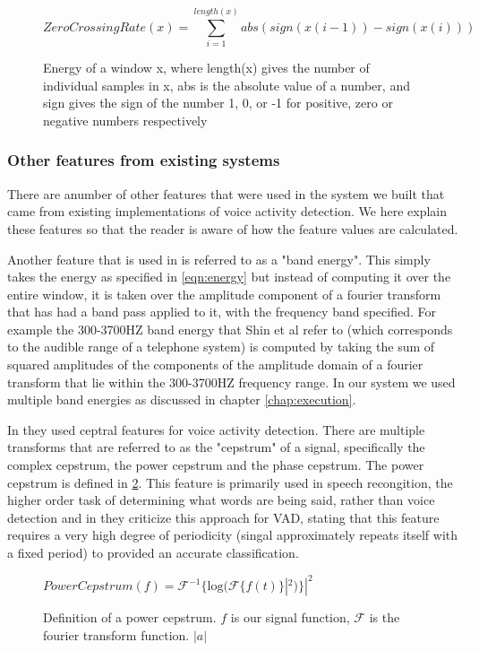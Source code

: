 \documentclass[ %
                    author={Sam Phippen},
                supervisor={Dr. Rafal Bogacz},
                     title={Real time voice activity detectors in noisy personal computing environments},
                  subtitle={},
                    degree={MEng},
                      year={2012} ]{thesis}
\begin{document}
\begin{figure} $$ZeroCrossingRate(x) =
    \sum_{i=1}^{length(x)}abs(sign(x(i-1))-sign(x(i)))$$ \label{eqn:zero-crossing-rate}
    \caption{Energy of a window x, where length(x) gives the number of
    individual samples in x, abs is the absolute value of a number, and sign
gives the sign of the number 1, 0, or -1 for positive, zero or negative numbers
respectively} \end{figure}

\subsubsection{Other features from existing systems}

There are anumber of other features that were used in the system we built that
came from existing implementations of voice activity detection. We here explain
these features so that the reader is aware of how the feature values are
calculated.

Another feature that is used in \cite{shin} is referred to as a "band energy".
This simply takes the energy as specified in \ref{eqn:energy} but instead of
computing it over the entire window, it is taken over the amplitude component
of a fourier transform that has had a band pass applied to it, with the
frequency band specified. For example the 300-3700HZ band energy that Shin et
al refer to (which corresponds to the audible range of a telephone system) is
computed by taking the sum of squared amplitudes of the components of the
amplitude domain of a fourier transform that lie within the 300-3700HZ
frequency range. In our system we used multiple band energies as discussed in
chapter \ref{chap:execution}.

In \cite{haigh} they used ceptral features for voice activity detection. There
are multiple transforms that are referred to as the "cepstrum" of a signal,
specifically the complex cepstrum, the power cepstrum and the phase
cepstrum\cite{childers}. The power cepstrum is defined in
\ref{eqn:power-cepstrum}. This feature is primarily used in speech recongition,
the higher order task of determining what words are being said, rather than
voice detection\cite{muda} and in \cite{atal} they criticize this approach for
VAD, stating that this feature requires a very high degree of periodicity
(singal approximately repeats itself with a fixed period) to provided an
accurate classification.

\begin{figure}
    $PowerCepstrum(f)=\mathcal{F}^{-1}\{\mbox{log}(\mathcal{F}\{ f(t) \}|^2)\}|^2$
    \caption{Definition of a power cepstrum. $f$ is our
    signal function, $\mathcal{F}$ is the fourier transform function. $|a|$}
    \label{eqn:power-cepstrum}

\end{figure}
\end{document}
